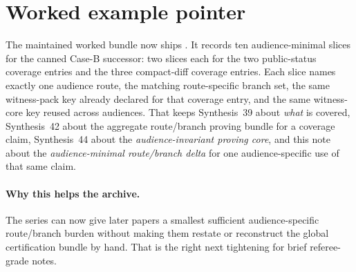 \documentclass[11pt]{article}
\begin{document}
\section{Worked example pointer}
The maintained worked bundle now ships .\cite{series:workedexample}
It records ten audience-minimal slices for the canned Case-B successor: two slices each for the two public-status coverage entries and the three compact-diff coverage entries.
Each slice names exactly one audience route, the matching route-specific branch set, the same witness-pack key already declared for that coverage entry, and the same witness-core key reused across audiences.
That keeps Synthesis~39 about \emph{what} is covered, Synthesis~42 about the aggregate route/branch proving bundle for a coverage claim, Synthesis~44 about the \emph{audience-invariant proving core}, and this note about the \emph{audience-minimal route/branch delta} for one audience-specific use of that same claim.\cite{series:challengecoverage,series:challengecoveragewitnesspacks,series:challengecoveragewitnesscores}

\paragraph{Why this helps the archive.}
The series can now give later papers a smallest sufficient audience-specific route/branch burden without making them restate or reconstruct the global certification bundle by hand.
That is the right next tightening for brief referee-grade notes.
\end{document}
